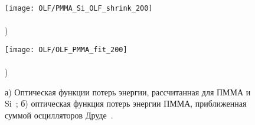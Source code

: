 \begin{figure}[t]
	\begin{minipage}{0.5\textwidth}
		\texttt{[image: OLF/PMMA\_Si\_OLF\_shrink\_200]} \\
		\vspace{-12.5em} \\ ) \\ \vspace{12.5em}
	\end{minipage}
	\begin{minipage}{0.5\textwidth}
		\texttt{[image: OLF/OLF\_PMMA\_fit\_200]} \\
		\vspace{-12.5em} \\ ) \\ \vspace{12.5em}
	\end{minipage}
	\vspace{-3.5em}
	\caption{а) Оптическая функции потерь энергии, рассчитанная для ПММА и Si~\cite{Palik, Ritchie_ELF}; б) оптическая функция потерь энергии ПММА, приближенная суммой осцилляторов Друде~\cite{Dapor_2015_oscillators}.}
	\label{fig:OLF}
\end{figure}


